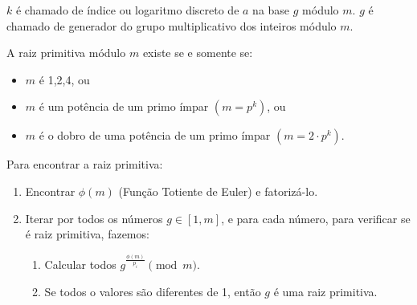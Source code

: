 $k$ é chamado de índice ou logaritmo discreto de $a$ na base $g$ módulo $m$. $g$ é chamado de generador do grupo multiplicativo dos inteiros módulo $m$.

A raiz primitiva módulo $m$ existe se e somente se:
\begin{itemize}
    \item $m$ é 1,2,4, ou
    \item $m$ é um potência de um primo ímpar $(m = p^k)$, ou
    \item $m$ é o dobro de uma potência de um primo ímpar $(m = 2\cdot p^k)$.
\end{itemize}

Para encontrar a raiz primitiva:
\begin{enumerate}
    \item Encontrar $\phi(m)$ (Função Totiente de Euler) e fatorizá-lo.
    \item Iterar por todos os números $g \in [1,m]$, e para cada número, para verificar se é raiz primitiva, fazemos:
    \begin{enumerate}
        \item Calcular todos $g^{\frac{\phi(m)}{p_i}} \pmod m$.
        \item Se todos o valores são diferentes de 1, então $g$ é uma raiz primitiva.
    \end{enumerate} 
\end{enumerate}
